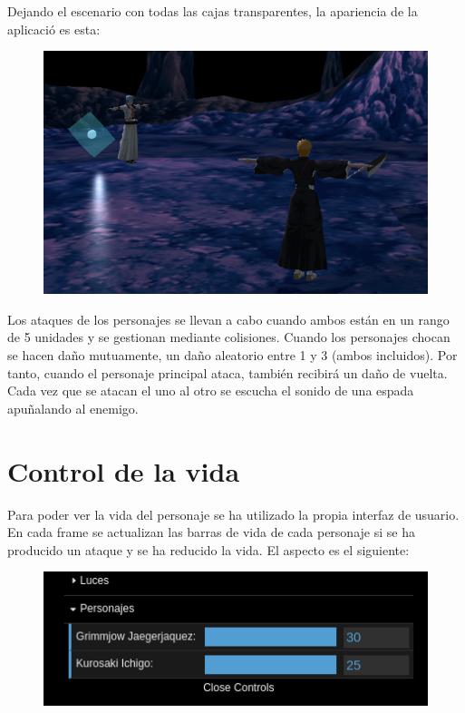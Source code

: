 \documentclass[11pt,a4paper]{article}
\begin{document}
Dejando el escenario con todas las cajas transparentes, la apariencia de la aplicació es esta:

\begin{figure}[H]
	\centering
	\includegraphics[scale=0.37]{img/inicio.png}
\end{figure}

Los ataques de los personajes se llevan a cabo cuando ambos están en un rango de 5 unidades y se gestionan mediante colisiones. Cuando los personajes chocan se hacen daño mutuamente, un daño aleatorio entre 1 y 3 (ambos incluidos). Por tanto, cuando el personaje principal ataca, también recibirá un daño de vuelta. Cada vez que se atacan el uno al otro se escucha el sonido de una espada apuñalando al enemigo.

\section{Control de la vida}

Para poder ver la vida del personaje se ha utilizado la propia interfaz de usuario. En cada frame se actualizan las barras de vida de cada personaje si se ha producido un ataque y se ha reducido la vida. El aspecto es el siguiente:

\begin{figure}[H]
	\centering
	\includegraphics[scale=0.5]{img/barravida.png}
\end{figure}
\end{document}

